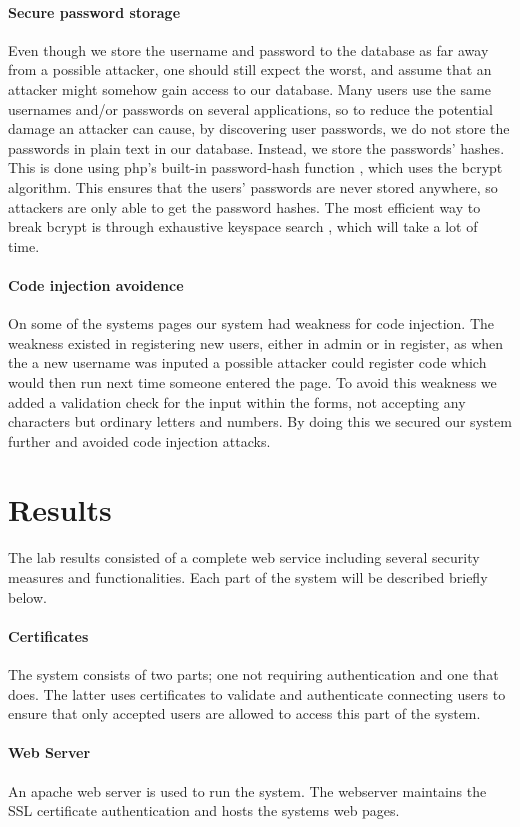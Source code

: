 \documentclass[11pt, a4paper]{article}
\begin{document}
\paragraph{Secure password storage}
Even though we store the username and password to the database as far away from a possible attacker, one should still expect the worst, and assume that an attacker might somehow gain access to our database. Many users use the same usernames and/or passwords on several applications, so to reduce the potential damage an attacker can cause, by discovering user passwords, we do not store the passwords in plain text in our database. Instead, we store the passwords' hashes. This is done using php's built-in password-hash function \cite{php-hash}, which uses the bcrypt \cite{schneier} algorithm. This ensures that the users' passwords are never stored anywhere, so attackers are only able to get the password hashes. The most efficient way to break bcrypt is through exhaustive keyspace search \cite{schneier}, which will take a lot of time.
\paragraph{Code injection avoidence}
On some of the systems pages our system had weakness for code injection. The weakness existed in registering new users, either in admin or in register, as when the a new username was inputed a possible attacker could register code which would then run next time someone entered the page. To avoid this weakness we added a validation check for the input within the forms, not accepting any characters but ordinary letters and numbers. By doing this we secured our system further and avoided code injection attacks.

\section{Results}
The lab results consisted of a complete web service including several security measures and functionalities. Each part of the system will be described briefly below.
\paragraph{Certificates}
The system consists of two parts; one not requiring authentication and one that does. The latter uses certificates to validate and authenticate connecting users to ensure that only accepted users are allowed to access this part of the system. 
\paragraph{Web Server}
An apache web server is used to run the system. The webserver maintains the SSL certificate authentication and hosts the systems web pages.
\end{document}
